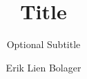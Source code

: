 \documentclass[a4paper, oneside, openany, british]{memoir}
\title{Title}
\subtitle{Optional Subtitle}
\author{Erik Lien Bolager}
\begin{document}
    \frontmatter        %

    \masterfrontpage


    \mainmatter         %
    
    
    


    \backmatter         %

    \printbibliography
\end{document}
